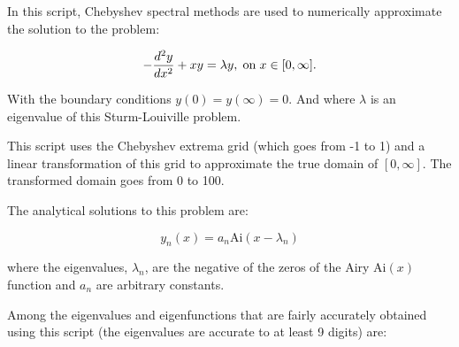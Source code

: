 \documentclass[12pt,a4paper,openright]{article}
\begin{document}
	In this script, Chebyshev spectral methods are used to numerically approximate the solution to the problem:
	
	\[
	- \dfrac{d^2 y}{dx^2} + xy = \lambda y, \hspace{0.1cm}\mathrm{on} \hspace{0.1cm} x\in[0,\infty].
	\]
	
	With the boundary conditions $y(0)=y(\infty)=0$. And where $\lambda$ is an eigenvalue of this Sturm-Louiville problem. 
	
	This script uses the Chebyshev extrema grid (which goes from -1 to 1) and a linear transformation of this grid to approximate the true domain of $[0,\infty]$. The transformed domain goes from 0 to 100. 
		
	The analytical solutions to this problem are:
	
	\[
	y_n(x) = a_n \mathrm{Ai}(x-\lambda_n)
	\]
	
	where the eigenvalues, $\lambda_n$, are the negative of the zeros of the Airy $\mathrm{Ai}(x)$ function and $a_n$ are arbitrary constants. 
	
	Among the eigenvalues and eigenfunctions that are fairly accurately obtained using this script (the eigenvalues are accurate to at least 9 digits) are:
\end{document}

